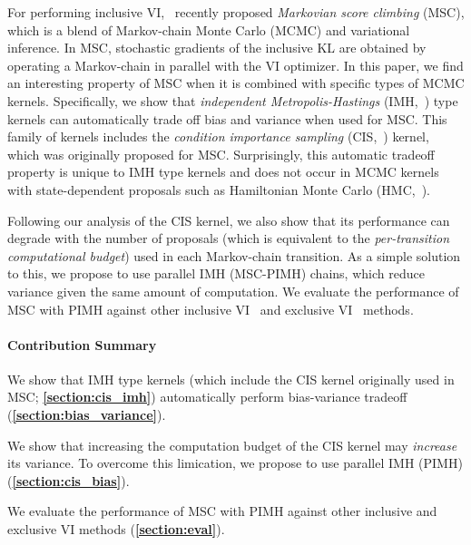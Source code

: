 For performing inclusive VI,~\citet{NEURIPS2020_b2070693, pmlr-v124-ou20a} recently proposed \textit{Markovian score climbing} (MSC), which is a blend of Markov-chain Monte Carlo (MCMC) and variational inference.
In MSC, stochastic gradients of the inclusive KL are obtained by operating a Markov-chain in parallel with the VI optimizer.
In this paper, we find an interesting property of MSC when it is combined with specific types of MCMC kernels.
Specifically, we show that \textit{independent Metropolis-Hastings} (IMH,~\citealt{robert_monte_2004}) type kernels can automatically trade off bias and variance when used for MSC.
This family of kernels includes the \textit{condition importance sampling} (CIS,~\citealt{NEURIPS2020_b2070693}) kernel, which was originally proposed for MSC.
Surprisingly, this automatic tradeoff property is unique to IMH type kernels and does not occur in MCMC kernels with state-dependent proposals such as Hamiltonian Monte Carlo (HMC,~\citealt{duane_hybrid_1987, neal_mcmc_2011, betancourt_conceptual_2017}).

Following our analysis of the CIS kernel, we also show that its performance can degrade with the number of proposals (which is equivalent to the \textit{per-transition computational budget}) used in each Markov-chain transition.
As a simple solution to this, we propose to use parallel IMH (MSC-PIMH) chains, which reduce variance given the same amount of computation.
We evaluate the performance of MSC with PIMH against other inclusive VI~\citep{DBLP:journals/corr/BornscheinB14, NEURIPS2020_b2070693} and exclusive VI~\citep{pmlr-v33-ranganath14, JMLR:v18:16-107} methods.

\vspace{-0.1in}
\paragraph{Contribution Summary}
\begin{enumerate*}[label=\textbf{(\roman*)}]
\item We show that IMH type kernels (which include the CIS kernel originally used in MSC; \textbf{\cref{section:cis_imh}}) automatically perform bias-variance tradeoff (\textbf{\cref{section:bias_variance}}).
\item We show that increasing the computation budget of the CIS kernel may \textit{increase} its variance.
  To overcome this limication, we propose to use parallel IMH (PIMH) (\textbf{\cref{section:cis_bias}}).
\item We evaluate the performance of MSC with PIMH against other inclusive and exclusive VI methods (\textbf{\cref{section:eval}}).
\end{enumerate*}

